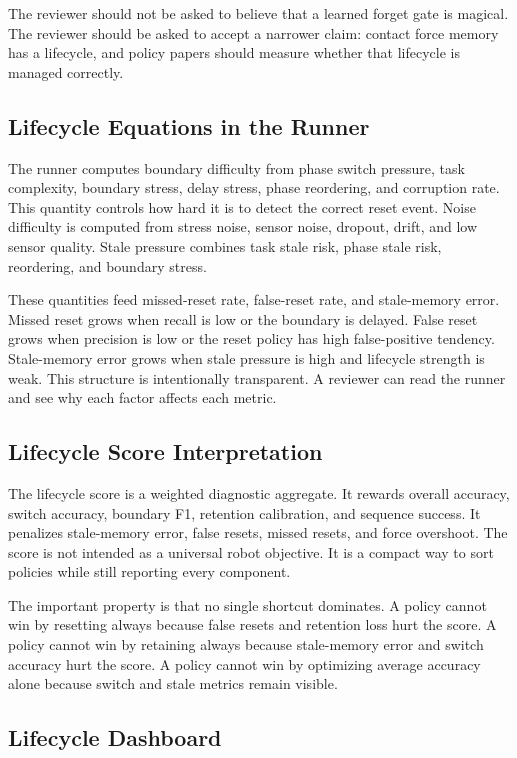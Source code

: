 \documentclass{article}
\begin{document}
The reviewer should not be asked to believe that a learned forget gate is
magical. The reviewer should be asked to accept a narrower claim: contact force
memory has a lifecycle, and policy papers should measure whether that lifecycle
is managed correctly.

\subsection{Lifecycle Equations in the Runner}

The runner computes boundary difficulty from phase switch pressure, task
complexity, boundary stress, delay stress, phase reordering, and corruption
rate. This quantity controls how hard it is to detect the correct reset event.
Noise difficulty is computed from stress noise, sensor noise, dropout, drift,
and low sensor quality. Stale pressure combines task stale risk, phase stale
risk, reordering, and boundary stress.

These quantities feed missed-reset rate, false-reset rate, and stale-memory
error. Missed reset grows when recall is low or the boundary is delayed. False
reset grows when precision is low or the reset policy has high false-positive
tendency. Stale-memory error grows when stale pressure is high and lifecycle
strength is weak. This structure is intentionally transparent. A reviewer can
read the runner and see why each factor affects each metric.

\subsection{Lifecycle Score Interpretation}

The lifecycle score is a weighted diagnostic aggregate. It rewards overall
accuracy, switch accuracy, boundary F1, retention calibration, and sequence
success. It penalizes stale-memory error, false resets, missed resets, and
force overshoot. The score is not intended as a universal robot objective. It is
a compact way to sort policies while still reporting every component.

The important property is that no single shortcut dominates. A policy cannot
win by resetting always because false resets and retention loss hurt the score.
A policy cannot win by retaining always because stale-memory error and switch
accuracy hurt the score. A policy cannot win by optimizing average accuracy
alone because switch and stale metrics remain visible.

\subsection{Lifecycle Dashboard}
\end{document}
